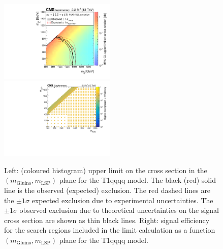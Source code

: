 \clearpage
\begin{figure}[t]
  \begin{center}
    \includegraphics[width=0.49\textwidth]{RA1T1qqqqXSEC_aux} \, 
    \includegraphics[width=0.49\textwidth]{T1qqqq_merging_4_cats_aux} \,     
  \end{center}
  \caption{Left: (coloured histogram) upper limit on the cross section in the $(m_{\mathrm{Gluino}},m_{\mathrm{LSP}})$ plane for the T1qqqq model. 
  The black (red) solid line is the observed (expected) exclusion. The red dashed lines are the $\pm1\sigma$ expected exclusion due to experimental uncertainties. 
  The $\pm1\sigma$ observed exclusion due to theoretical uncertainties on the signal cross section are shown as thin black lines. 
  Right: signal efficiency for the search regions included in the limit calculation as a function $(m_{\mathrm{Gluino}},m_{\mathrm{LSP}})$ plane for the T1qqqq model. 
  \label{fig:T1qqqq_excl}}
\end{figure}

